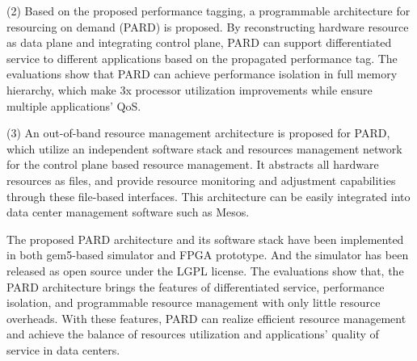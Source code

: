 \begin{eabstract}
  (2) Based on the proposed performance tagging, a programmable architecture for
      resourcing on demand (PARD) is proposed.
      By reconstructing hardware resource as data plane and integrating control plane,
      PARD can support differentiated service to different applications
      based on the propagated performance tag.
      The evaluations show that PARD can achieve performance isolation in
      full memory hierarchy, which make 3x processor utilization improvements
      while ensure multiple applications' QoS.

  (3) An out-of-band resource management architecture is proposed for PARD,
      which utilize an independent software stack and resources management network
      for the control plane based resource management.
      It abstracts all hardware resources as files,
      and provide resource monitoring and adjustment capabilities through
      these file-based interfaces.
      This architecture can be easily integrated into data center management software
      such as Mesos.

  The proposed PARD architecture and its software stack have been implemented 
  in both gem5-based simulator and FPGA prototype.
  And the simulator has been released as open source under the LGPL license.
  The evaluations show that, the PARD architecture brings
  the features of differentiated service, performance isolation,
  and programmable resource management with only little resource overheads.
  With these features, PARD can realize efficient resource management and
  achieve the balance of resources utilization and
  applications' quality of service in data centers.



\end{eabstract}
